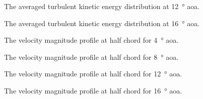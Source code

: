 \begin{figure}[htpb]
    \centering
    
    \caption{The averaged turbulent kinetic energy distribution at \qty{12}{\degree} \acrshort{aoa}.}
    \label{fig:full_averaged_ke_aoa12}
\end{figure}

\begin{figure}[htpb]
    \centering
    
    \caption{The averaged turbulent kinetic energy distribution at \qty{16}{\degree} \acrshort{aoa}.}
    \label{fig:full_averaged_ke_aoa16}
\end{figure}

\begin{figure}[htpb]
    \centering
    
    \caption{The velocity magnitude profile at half chord for \qty{4}{\degree} \acrshort{aoa}.}
    \label{fig:full_averaged_half_chord_aoa4}
\end{figure}

\begin{figure}[htpb]
    \centering
    
    \caption{The velocity magnitude profile at half chord for \qty{8}{\degree} \acrshort{aoa}.}
    \label{fig:full_averaged_half_chord_aoa8}
\end{figure}

\begin{figure}[htpb]
    \centering
    
    \caption{The velocity magnitude profile at half chord for \qty{12}{\degree} \acrshort{aoa}.}
    \label{fig:full_averaged_half_chord_aoa12}
\end{figure}

\begin{figure}[htpb]
    \centering
    
    \caption{The velocity magnitude profile at half chord for \qty{16}{\degree} \acrshort{aoa}.}
    \label{fig:full_averaged_half_chord_aoa16}
\end{figure}